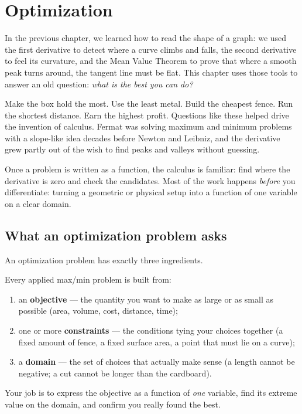 \chapter{Optimization}

In the previous chapter, we learned how to read the shape of a graph: we used the
first derivative to detect where a curve climbs and falls, the second derivative
to feel its curvature, and the Mean Value Theorem to prove that where a smooth peak
turns around, the tangent line must be flat. This chapter uses those tools to answer
an old question: \emph{what is the best you can do?}

Make the box hold the most. Use the least metal. Build the cheapest fence. Run the
shortest distance. Earn the highest profit. Questions like these helped drive the
invention of calculus. Fermat was solving maximum and minimum problems with a
slope-like idea decades before Newton and Leibniz, and the derivative grew partly out
of the wish to find peaks and valleys without guessing.

Once a problem is written as a function, the calculus is familiar: find where the
derivative is zero and check the candidates. Most of the work happens \emph{before}
you differentiate: turning a geometric or physical setup into a function of one
variable on a clear domain.

\section{What an optimization problem asks}

An optimization problem has exactly three ingredients.

\begin{focusbox}
Every applied max/min problem is built from:
\begin{enumerate}
  \item an \textbf{objective} --- the quantity you want to make as large or as small
    as possible (area, volume, cost, distance, time);
  \item one or more \textbf{constraints} --- the conditions tying your choices
    together (a fixed amount of fence, a fixed surface area, a point that must lie on
    a curve);
  \item a \textbf{domain} --- the set of choices that actually make sense (a length
    cannot be negative; a cut cannot be longer than the cardboard).
\end{enumerate}
Your job is to express the objective as a function of \emph{one} variable, find its
extreme value on the domain, and confirm you really found the best.
\end{focusbox}


